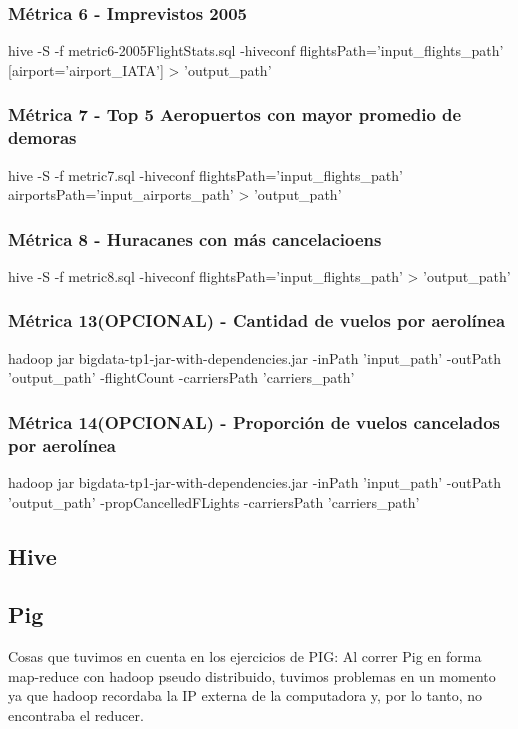\documentclass[a4paper,10pt]{article}
\begin{document}
        \subsubsection{Métrica 6 - Imprevistos 2005}
        \scriptsize{hive -S -f metric6-2005FlightStats.sql -hiveconf flightsPath='input\_flights\_path' [airport='airport\_IATA'] > 'output\_path'}
        \subsubsection{Métrica 7 - Top 5 Aeropuertos con mayor promedio de demoras}
        \scriptsize{hive -S -f metric7.sql -hiveconf flightsPath='input\_flights\_path' airportsPath='input\_airports\_path' > 'output\_path'}
        \subsubsection{Métrica 8 - Huracanes con más cancelacioens}
        \scriptsize{hive -S -f metric8.sql -hiveconf flightsPath='input\_flights\_path' > 'output\_path'}
        \subsubsection{Métrica 13(OPCIONAL) - Cantidad de vuelos por aerolínea}
            \scriptsize{hadoop jar bigdata-tp1-jar-with-dependencies.jar -inPath 'input\_path' -outPath 'output\_path' -flightCount -carriersPath 'carriers\_path'}
        \subsubsection{Métrica 14(OPCIONAL) - Proporción de vuelos cancelados por aerolínea}
            \scriptsize{hadoop jar bigdata-tp1-jar-with-dependencies.jar -inPath 'input\_path' -outPath 'output\_path' -propCancelledFLights -carriersPath 'carriers\_path'}

    \subsection{Hive}

    \subsection{Pig}
        Cosas que tuvimos en cuenta en los ejercicios de PIG:
Al correr Pig en forma map-reduce con hadoop pseudo distribuido, tuvimos problemas en un momento ya que hadoop recordaba la IP externa de la computadora y, por lo tanto, no encontraba el reducer.
\end{document}

